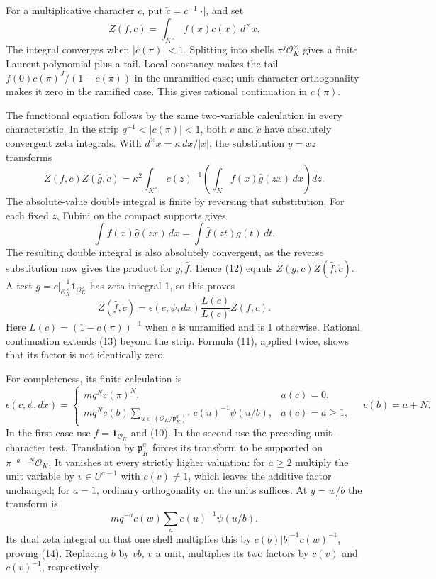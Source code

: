 \documentclass[11pt,a4paper]{article}
\begin{document}
For a multiplicative character \(c\), put \(\check c=c^{-1}|\cdot|\),
and set \[
Z(f,c)=\int_{K^\times}f(x)c(x)\,d^\times x.
\] The integral converges when \(|c(\pi)|<1\). Splitting into shells
\(\pi^j\mathcal O_K^\times\) gives a finite Laurent polynomial plus a
tail. Local constancy makes the tail \(f(0)c(\pi)^J/(1-c(\pi))\) in the
unramified case; unit-character orthogonality makes it zero in the
ramified case. This gives rational continuation in \(c(\pi)\).

The functional equation follows by the same two-variable calculation in
every characteristic. In the strip \(q^{-1}<|c(\pi)|<1\), both \(c\) and
\(\check c\) have absolutely convergent zeta integrals. With
\(d^\times x=\kappa\,dx/|x|\), the substitution \(y=xz\) transforms \[
Z(f,c)Z(\widehat g,\check c)
=\kappa^2\int_{K^\times}c(z)^{-1}
       \left(\int_K f(x)\widehat g(zx)\,dx\right)dz.
\tag{12}
\] The absolute-value double integral is finite by reversing that
substitution. For each fixed \(z\), Fubini on the compact supports gives
\[
\int f(x)\widehat g(zx)\,dx=\int\widehat f(zt)g(t)\,dt.
\] The resulting double integral is also absolutely convergent, as the
reverse substitution now gives the product for \(g,\widehat f\). Hence
(12) equals \(Z(g,c)Z(\widehat f,\check c)\). A test
\(g=c|_{\mathcal O_K^\times}^{-1}\mathbf1_{\mathcal O_K^\times}\) has
zeta integral 1, so this proves \[
Z(\widehat f,\check c)
=\epsilon(c,\psi,dx)\frac{L(\check c)}{L(c)}Z(f,c).
\tag{13}
\] Here \(L(c)=(1-c(\pi))^{-1}\) when \(c\) is unramified and is 1
otherwise. Rational continuation extends (13) beyond the strip. Formula
(11), applied twice, shows that its factor is not identically zero.

For completeness, its finite calculation is \[
\epsilon(c,\psi,dx)=
\begin{cases}
m q^N c(\pi)^N,&a(c)=0,\\
m q^N c(b)\displaystyle\sum_{u\in(\mathcal O_K/\mathfrak p_K^a)^\times}
 c(u)^{-1}\psi(u/b),&a(c)=a\geq1,
\end{cases}
\quad v(b)=a+N.
\tag{14}
\] In the first case use \(f=\mathbf1_{\mathcal O_K}\) and (10). In the
second use the preceding unit-character test. Translation by
\(\mathfrak p_K^a\) forces its transform to be supported on
\(\pi^{-a-N}\mathcal O_K\). It vanishes at every strictly higher
valuation: for \(a\geq2\) multiply the unit variable by \(v\in U^{a-1}\)
with \(c(v)\ne1\), which leaves the additive factor unchanged; for
\(a=1\), ordinary orthogonality on the units suffices. At \(y=w/b\) the
transform is \[
m q^{-a}c(w)\sum_u c(u)^{-1}\psi(u/b).
\] Its dual zeta integral on that one shell multiplies this by
\(c(b)|b|^{-1}c(w)^{-1}\), proving (14). Replacing \(b\) by \(vb\),
\(v\) a unit, multiplies its two factors by \(c(v)\) and \(c(v)^{-1}\),
respectively.
\end{document}
